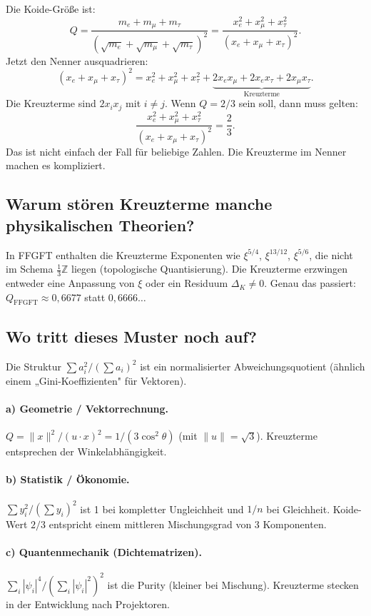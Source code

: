 Die Koide-Größe ist:
\[
  Q = \frac{m_e+m_\mu+m_\tau}{(\sqrt{m_e}+\sqrt{m_\mu}+\sqrt{m_\tau})^2}
  = \frac{x_e^2+x_\mu^2+x_\tau^2}{(x_e+x_\mu+x_\tau)^2}.
\]
Jetzt den Nenner ausquadrieren:
\[
  (x_e+x_\mu+x_\tau)^2 = x_e^2+x_\mu^2+x_\tau^2
  + \underbrace{2x_ex_\mu+2x_ex_\tau+2x_\mu x_\tau}_{\text{Kreuzterme}}.
\]
Die Kreuzterme sind $2x_ix_j$ mit $i\neq j$.
Wenn $Q=2/3$ sein soll, dann muss gelten:
\[
  \frac{x_e^2+x_\mu^2+x_\tau^2}{(x_e+x_\mu+x_\tau)^2}=\frac{2}{3}.
\]
Das ist nicht einfach der Fall für beliebige Zahlen.
Die Kreuzterme im Nenner machen es kompliziert.

\subsection{Warum stören Kreuzterme manche physikalischen Theorien?}

In FFGFT enthalten die Kreuzterme Exponenten wie $\xi^{5/4}$,
$\xi^{13/12}$, $\xi^{5/6}$, die nicht im Schema $\tfrac{1}{3}\mathbb{Z}$
liegen (topologische Quantisierung). Die Kreuzterme erzwingen entweder
eine Anpassung von $\xi$ oder ein Residuum $\Delta_K\neq0$.
Genau das passiert: $Q_{\text{FFGFT}}\approx0{,}6677$ statt $0{,}6666\ldots$

\subsection{Wo tritt dieses Muster noch auf?}

Die Struktur $\sum a_i^2/(\sum a_i)^2$ ist ein normalisierter
Abweichungsquotient (ähnlich einem „Gini-Koeffizienten" für Vektoren).

\paragraph{a) Geometrie / Vektorrechnung.}
$Q=\|x\|^2/(u\cdot x)^2=1/(3\cos^2\theta)$ (mit $\|u\|=\sqrt{3}$).
Kreuzterme entsprechen der Winkelabhängigkeit.

\paragraph{b) Statistik / Ökonomie.}
$\sum y_i^2/(\sum y_i)^2$ ist 1 bei kompletter Ungleichheit und $1/n$ bei Gleichheit.
Koide-Wert $2/3$ entspricht einem mittleren Mischungsgrad von 3 Komponenten.

\paragraph{c) Quantenmechanik (Dichtematrizen).}
$\sum_i|\psi_i|^4/(\sum_i|\psi_i|^2)^2$ ist die Purity (kleiner bei Mischung).
Kreuzterme stecken in der Entwicklung nach Projektoren.

